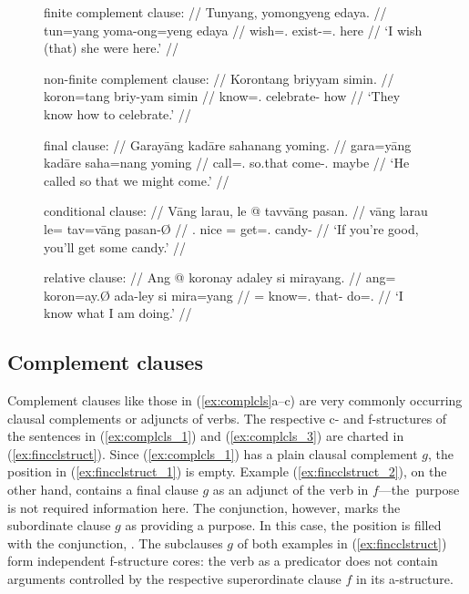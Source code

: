 \begin{figure}
\pex\label{ex:complcls}
\a\label{ex:complcls_1}\begingl
	\glpreamble finite complement clause: //
	\gla Tunyang, yomongyeng edaya. //
	\glb tun=yang yoma-ong=yeng edaya //
	\glc wish=\Fsg{}.\Aarg{} exist-\Irr{}=\Fsg{}.\Aarg{} here //
	\glft `I wish (that) she were here.' //
\endgl

\a\label{ex:complcls_2}\begingl
	\glpreamble non-finite complement clause: //
	\gla Korontang briyyam simin. //
	\glb koron=tang briy-yam simin //
	\glc know=\TplM{}.\Aarg{} celebrate-\Ptcp{} how //
	\glft `They know how to celebrate.' //
\endgl

\a\label{ex:complcls_3}\begingl
	\glpreamble final clause: //
	\gla Garayāng kadāre sahanang yoming. //
	\glb gara=yāng kadāre saha=nang yoming //
	\glc call=\TsgM{}.\Aarg{} so.that come-\Fpl{}.\Aarg{} maybe //
	\glft `He called so that we might come.' //
\endgl

\a\label{ex:complcls_4}\begingl
	\glpreamble conditional clause: //
	\gla Vāng larau, le @ tavvāng pasan. //
	\glb vāng larau le= tav=vāng pasan-Ø //
	\glc \Second{}.\Aarg{} nice \PatT{}= get=\Second{}.\Aarg{} candy-\Top{} //
	\glft `If you're good, you'll get some candy.' //
\endgl

\a\label{ex:complcls_5}\begingl
	\glpreamble relative clause: //
	\gla Ang @ koronay adaley si mirayang. //
	\glb ang= koron=ay.Ø ada-ley si mira=yang //
	\glc \AgtT{}= know=\Fsg{}.\Top{} that-\PargI{} \Rel{} do=\Fsg{}.\Aarg{} //
	\glft `I know what I am doing.' //
\endgl

\xe
\end{figure}

\subsection{Complement clauses}
\label{subsec:complcs}

Complement clauses like those in (\ref{ex:complcls}a–c) are very commonly
occurring clausal complements or adjuncts of verbs. The respective c- and
f-structures of the sentences in (\ref{ex:complcls_1}) and
(\ref{ex:complcls_3}) are charted in (\ref{ex:fincclstruct}). Since
(\ref{ex:complcls_1}) has a plain clausal complement $g$, the 
position in (\ref{ex:fincclstruct_1}) is empty. Example
(\ref{ex:fincclstruct_2}), on the other hand, contains a final clause $g$ as an
adjunct of the verb in $f$---the purpose is not required information here. The
conjunction, however, marks the subordinate clause $g$ as providing a purpose.
In this case, the  position is filled with the conjunction, 
. The subclauses $g$ of both examples in
(\ref{ex:fincclstruct}) form independent f-structure cores: the verb as a
predicator does not contain arguments controlled by the respective
superordinate clause $f$ in its a-structure.


